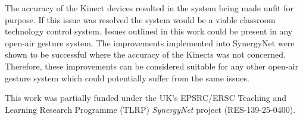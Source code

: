 \documentclass[manuscript, review, screen]{acmart}
\begin{document}
The accuracy of the Kinect devices resulted in the system being made unfit for purpose.
If this issue was resolved the system would be a viable classroom technology control system.
Issues outlined in this work could be present in any open-air gesture system.
The improvements implemented into SynergyNet were shown to be successful where the accuracy of the Kinects was not concerned.
Therefore, these improvements can be considered suitable for any other open-air gesture system which could potentially suffer from the same issues.


\begin{acks}

This work was partially funded under the UK's EPSRC/ERSC Teaching and Learning Research Programme (TLRP) {\emph{SynergyNet}} project (RES-139-25-0400).


\end{acks}



\end{document}
